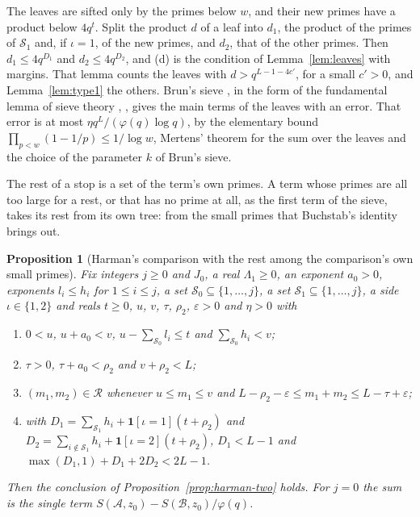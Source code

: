 \documentclass[11pt]{article}
\newtheorem{proposition}[theorem]{Proposition}
\theoremstyle{definition}
\begin{document}
The leaves are sifted only by the primes below $w$, and their new primes have a product below $4q^t$. Split the
product $d$ of a leaf into $d_1$, the product of the primes of $\mathcal S_1$ and, if $\iota = 1$, of the new primes,
and $d_2$, that of the other primes. Then $d_1 \le 4q^{D_1}$ and $d_2 \le 4q^{D_2}$, and (d) is the condition of
Lemma~\ref{lem:leaves} with margins. That lemma counts the leaves with $d > q^{L - 1 - 4c'}$, for a small $c' > 0$,
and Lemma~\ref{lem:type1} the others.
Brun's sieve \cite{brun}, in the form of the fundamental lemma of sieve theory \cite{friedlander-iwaniec},
\cite[Chapter~6]{iwaniec-kowalski}, gives the main terms of the leaves with an error. That error is at most
$\eta q^L/(\varphi(q) \log q)$, by the elementary bound $\prod_{p < w}(1 - 1/p) \le 1/\log w$, Mertens' theorem for the
sum over the leaves and the choice of the parameter $k$ of Brun's sieve.

The rest of a stop is a set of the term's own primes. A term whose primes are all too large for a rest, or that has no
prime at all, as the first term of the sieve, takes its rest from its own tree: from the small primes that Buchstab's
identity brings out.

\begin{proposition}[Harman's comparison with the rest among the comparison's own small primes]\label{prop:harman-fill}
Fix integers $j \ge 0$ and $J_0$, a real $\Lambda_1 \ge 0$, an exponent $a_0 > 0$, exponents $l_i \le h_i$ for
$1 \le i \le j$, a set $\mathcal S_0 \subseteq \{1, \dots, j\}$, a set $\mathcal S_1 \subseteq \{1, \dots, j\}$, a side
$\iota \in \{1, 2\}$ and reals $t \ge 0$, $u$, $v$, $\tau$, $\rho_2$, $\varepsilon > 0$ and $\eta > 0$ with
\begin{enumerate}
\item[(a)] $0 < u$, $u + a_0 < v$, $u - \sum_{\mathcal S_0} l_i \le t$ and $\sum_{\mathcal S_0} h_i < v$;
\item[(b)] $\tau > 0$, $\tau + a_0 < \rho_2$ and $v + \rho_2 < L$;
\item[(c)] $(m_1, m_2) \in \mathcal R$ whenever $u \le m_1 \le v$ and $L - \rho_2 - \varepsilon \le m_1 + m_2 \le L -
  \tau + \varepsilon$;
\item[(d)] with $D_1 = \sum_{\mathcal S_1} h_i + \mathbf 1[\iota = 1](t + \rho_2)$ and $D_2 = \sum_{i \notin \mathcal
  S_1} h_i + \mathbf 1[\iota = 2](t + \rho_2)$, $D_1 < L - 1$ and $\max(D_1, 1) + D_1 + 2D_2 < 2L - 1$.
\end{enumerate}
Then the conclusion of Proposition~\ref{prop:harman-two} holds. For $j = 0$ the sum is the single term
$S(\mathcal A, z_0) - S(\mathcal B, z_0)/\varphi(q)$.
\end{proposition}
\end{document}
